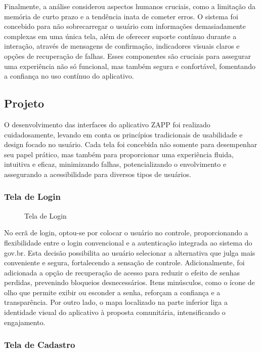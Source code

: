 \documentclass[a4paper, 12pt]{article}
\begin{document}
Finalmente, a análise considerou aspectos humanos cruciais, como a limitação da memória de curto prazo e a tendência inata de cometer erros. O sistema foi concebido para não sobrecarregar o usuário com informações demasiadamente complexas em uma única tela, além de oferecer suporte contínuo durante a interação, através de mensagens de confirmação, indicadores visuais claros e opções de recuperação de falhas. Esses componentes são cruciais para assegurar uma experiência não só funcional, mas também segura e confortável, fomentando a confiança no uso contínuo do aplicativo.

\subsection{Projeto}
O desenvolvimento das interfaces do aplicativo ZAPP foi realizado cuidadosamente, levando em conta os princípios tradicionais de usabilidade e design focado no usuário.  Cada tela foi concebida não somente para desempenhar seu papel prático, mas também para proporcionar uma experiência fluida, intuitiva e eficaz, minimizando falhas, potencializando o envolvimento e assegurando a acessibilidade para diversos tipos de usuários.

\subsubsection{Tela de Login}

\begin{figure}[H]
  \centering
  \caption{Tela de Login}
  \label{fig:login}
\end{figure}

No ecrã de login, optou-se por colocar o usuário no controle, proporcionando a flexibilidade entre o login convencional e a autenticação integrada ao sistema do gov.br.  Esta decisão possibilita ao usuário selecionar a alternativa que julga mais conveniente e segura, fortalecendo a sensação de controle.  Adicionalmente, foi adicionada a opção de recuperação de acesso para reduzir o efeito de senhas perdidas, prevenindo bloqueios desnecessários.  Itens minúsculos, como o ícone de olho que permite exibir ou esconder a senha, reforçam a confiança e a transparência. Por outro lado, o mapa localizado na parte inferior liga a identidade visual do aplicativo à proposta comunitária, intensificando o engajamento.

\subsubsection{Tela de Cadastro}
\end{document}
